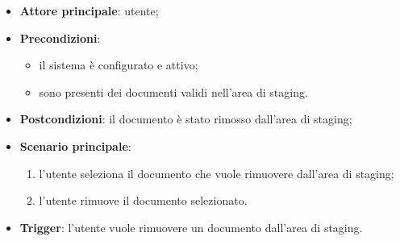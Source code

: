 \documentclass[10pt, a4paper]{article}
\begin{document}
    \begin{itemize}
        \item \textbf{Attore principale}: utente;
        \item \textbf{Precondizioni}:
            \begin{itemize}
                \item il sistema è configurato e attivo;
                \item sono presenti dei documenti validi nell’area di staging.
            \end{itemize}
        \item \textbf{Postcondizioni}: il documento è stato rimosso dall’area di staging;
        \item \textbf{Scenario principale}: 
            \begin{enumerate}
                \item l’utente seleziona il documento che vuole rimuovere dall’area di staging;
                \item l’utente rimuove il documento selezionato.
            \end{enumerate}
        \item \textbf{Trigger}: l’utente vuole rimuovere un documento dall’area di staging.
    \end{itemize}
\end{document}
